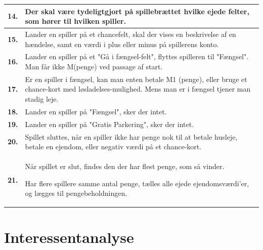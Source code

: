 \begin{tabular}{| l |p{13cm}|}
    \hline
    \textbf{14.} 
    &
    Der skal være tydeligtgjort på spillebrættet hvilke ejede felter, som hører til hvilken spiller. 
    \\
      
    \hline
    \textbf{15.}
    &
    Lander en spiller på et chancefelt, skal der vises en beskrivelse af en hændelse, samt en værdi i plus eller minus på spillerens konto. 
    \\

    \hline
    \textbf{16.}
    &
    Lander en spiller på et "Gå i fængsel-felt", flyttes spilleren til "Fængsel". Man får ikke M(penge) ved passage af start. 
    \\
      
    \hline
    \textbf{17.}
    &
    Er en spiller i fængsel, kan man enten betale M1 (penge), eller bruge et chance-kort med løsladelses-mulighed. Mens man er i fængsel tjener man stadig leje. 
    \\
      
    \hline
    \textbf{18.}
    &
    Lander en spiller på "Fængsel", sker der intet. 
    \\
      
    \hline
    \textbf{19.}
    &
    Lander en spiller på "Gratis Parkering", sker der intet. 
    \\
      
    \hline
    \textbf{20.}
    &
    Spillet sluttes, når en spiller ikke har penge nok til at betale husleje, betale en ejendom, eller negativ værdi på et chance-kort. 
    \\
      
    \hline
    \textbf{21.}
    &
    Når spillet er slut, findes den der har flest penge, som så vinder. 
    
    Har flere spillere samme antal penge, tælles alle ejede ejendomsværdi’er, og lægges til pengebeholdningen. 
    \\
      
    \hline
\end{tabular}

\pagebreak

\section{Interessentanalyse}


